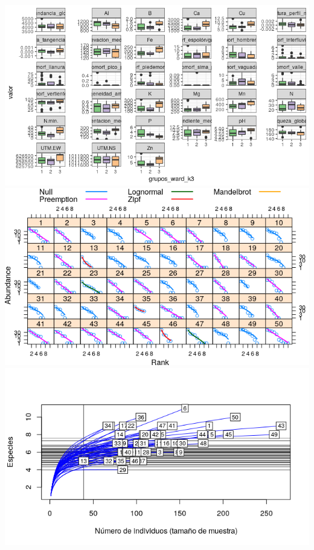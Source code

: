 \documentclass[11pt,]{article}
\begin{document}
\includegraphics[width=1.00000\textwidth]{cuadro_cajas_ward.png}
\includegraphics[width=1.00000\textwidth]{modelo_abundancia_especie.png}
\includegraphics[width=1.00000\textwidth]{Numero_individuos.png}
\end{document}
